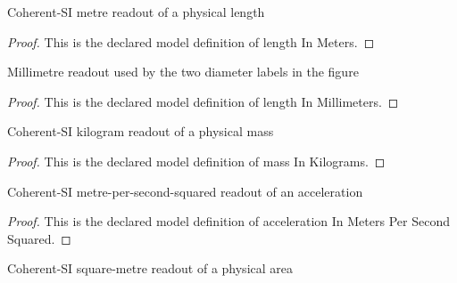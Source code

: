 \begin{definition}
  \label{def:physics:phyx-mini-0395:phyxminiproblems-problemphyxmini0395-lengthinmeters}
  Coherent-SI metre readout of a physical length
\end{definition}
\begin{proof}
  This is the declared model definition of length In Meters.
\end{proof}
\begin{definition}
  \label{def:physics:phyx-mini-0395:phyxminiproblems-problemphyxmini0395-lengthinmillimeters}
  Millimetre readout used by the two diameter labels in the figure
\end{definition}
\begin{proof}
  This is the declared model definition of length In Millimeters.
\end{proof}
\begin{definition}
  \label{def:physics:phyx-mini-0395:phyxminiproblems-problemphyxmini0395-massinkilograms}
  Coherent-SI kilogram readout of a physical mass
\end{definition}
\begin{proof}
  This is the declared model definition of mass In Kilograms.
\end{proof}
\begin{definition}
  \label{def:physics:phyx-mini-0395:phyxminiproblems-problemphyxmini0395-accelerationinmeterspersecondsquared}
  Coherent-SI metre-per-second-squared readout of an acceleration
\end{definition}
\begin{proof}
  This is the declared model definition of acceleration In Meters Per Second Squared.
\end{proof}
\begin{definition}
  \label{def:physics:phyx-mini-0395:phyxminiproblems-problemphyxmini0395-areainsquaremeters}
  Coherent-SI square-metre readout of a physical area
\end{definition}
